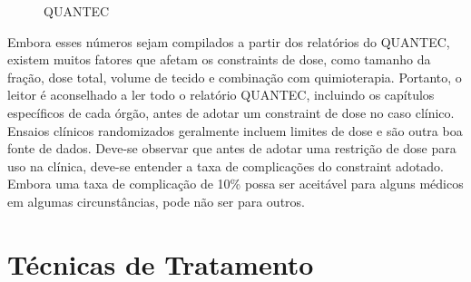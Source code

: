 \documentclass[11pt,a4paper]{article}
\begin{document}
	\begin{figure}[h]
		\centering
		\caption{QUANTEC}
		\label{fig:quantec}
	\end{figure}

	Embora esses números sejam compilados a partir dos relatórios do QUANTEC, existem muitos fatores que afetam os constraints de dose, como tamanho da fração, dose total, volume de tecido e combinação com quimioterapia. Portanto, o leitor é aconselhado a ler todo o relatório QUANTEC, incluindo os capítulos específicos de cada órgão, antes de adotar um constraint de dose no caso clínico. Ensaios clínicos randomizados geralmente incluem limites de dose e são outra boa fonte de dados. Deve-se observar que antes de adotar uma restrição de dose para uso na clínica, deve-se entender a taxa de complicações do constraint adotado. Embora uma taxa de complicação de 10\% possa ser aceitável para alguns médicos em algumas circunstâncias, pode não ser para outros. 

\section{Técnicas de Tratamento}
\end{document}
